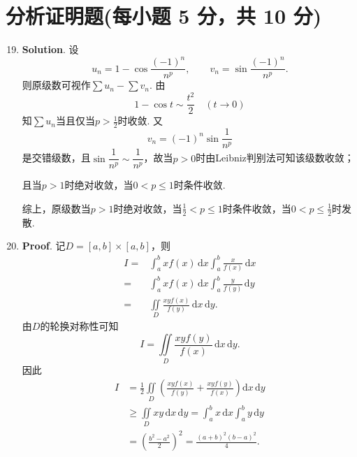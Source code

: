 \documentclass[../main.tex]{subfiles}
\begin{document}
\section{分析证明题(每小题 5 分，共 10 分)}
\begin{enumerate}
    \setcounter{enumi}{18}
    \item \textbf{Solution}. 设
          \[
              u_n=1-\cos\frac{(-1)^n}{n^p},\qquad v_n=\sin\frac{(-1)^n}{n^p}.
          \]
          则原级数可视作$\sum u_n-\sum v_n$.
          由
          \[
              1-\cos t\sim \frac{t^2}{2}\quad(t\to0)
          \]
          知$\sum u_n$当且仅当$p>\frac12$时收敛. 又
          \[
              v_n=(-1)^n\sin\frac1{n^p}
          \]
          是交错级数，且$\sin\dfrac1{n^p}\sim\dfrac1{n^p}$，故当$p>0$时由Leibniz判别法可知该级数收敛；

          且当$p>1$时绝对收敛，当$0<p\le1$时条件收敛.

          综上，原级数当$p>1$时绝对收敛，当$\frac12<p\le1$时条件收敛，当$0<p\le\frac12$时发散.

    \item \textbf{Proof}. 记$D=[a,b]\times[a,b]$，则
          \[
              \begin{aligned}
                  I={} & \int_a^bxf(x)\,\mathrm{d}x\int_a^b\frac{x}{f(x)}\,\mathrm{d}x \\
                  ={}  & \int_a^bxf(x)\,\mathrm{d}x\int_a^b\frac{y}{f(y)}\,\mathrm{d}y \\
                  ={}  & \iint\limits_D\frac{xyf(x)}{f(y)}\,\mathrm{d}x\,\mathrm{d}y.
              \end{aligned}
          \]
          由$D$的轮换对称性可知
          \[
              I=\iint\limits_D\frac{xyf(y)}{f(x)}\,\mathrm{d}x\,\mathrm{d}y.
          \]
          因此
          \[
              \begin{aligned}
                  I
                   & =\frac12\iint\limits_D\left(\frac{xyf(x)}{f(y)}+\frac{xyf(y)}{f(x)}\right)\mathrm{d}x\,\mathrm{d}y   \\
                   & \geq \iint\limits_Dxy\,\mathrm{d}x\,\mathrm{d}y=\int_{a}^{b}x\,\mathrm{d}x\int_{a}^{b}y\,\mathrm{d}y \\
                   & =\left(\frac{b^2-a^2}{2}\right)^2=\frac{(a+b)^2(b-a)^2}{4}.
              \end{aligned}
          \]

\end{enumerate}
\end{document}
